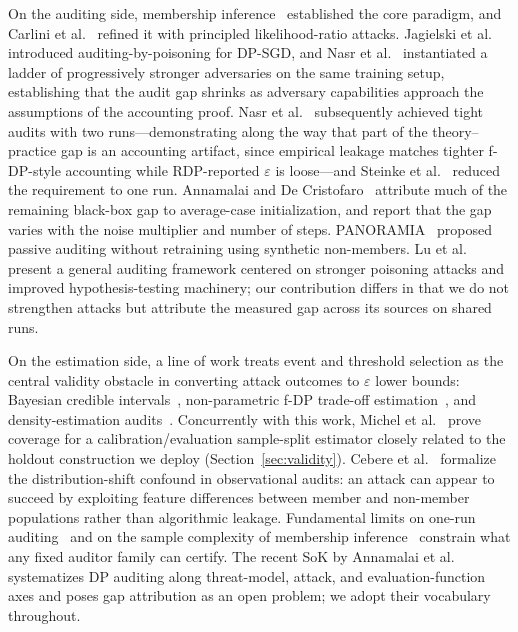 \documentclass{article}
\begin{document}
On the auditing side, membership inference~\citep{shokri2017membership} established the core paradigm, and Carlini et al.~\citep{carlini2022membership} refined it with principled likelihood-ratio attacks. Jagielski et al.~\citep{jagielski2020auditing} introduced auditing-by-poisoning for DP-SGD, and Nasr et al.~\citep{nasr2021adversary} instantiated a ladder of progressively stronger adversaries on the same training setup, establishing that the audit gap shrinks as adversary capabilities approach the assumptions of the accounting proof. Nasr et al.~\citep{nasr2023tight} subsequently achieved tight audits with two runs---demonstrating along the way that part of the theory--practice gap is an accounting artifact, since empirical leakage matches tighter f-DP-style accounting while RDP-reported $\varepsilon$ is loose---and Steinke et al.~\citep{steinke2023privacy} reduced the requirement to one run. Annamalai and De Cristofaro~\citep{annamalai2024nearly} attribute much of the remaining black-box gap to average-case initialization, and report that the gap varies with the noise multiplier and number of steps. PANORAMIA~\citep{kazmi2024panoramia} proposed passive auditing without retraining using synthetic non-members. Lu et al.~\citep{lu2022general} present a general auditing framework centered on stronger poisoning attacks and improved hypothesis-testing machinery; our contribution differs in that we do not strengthen attacks but attribute the measured gap across its sources on shared runs.

On the estimation side, a line of work treats event and threshold selection as the central validity obstacle in converting attack outcomes to $\varepsilon$ lower bounds: Bayesian credible intervals~\citep{zanella2023bayesian}, non-parametric f-DP trade-off estimation~\citep{askin2025fdp}, and density-estimation audits~\citep{koskela2025density}. Concurrently with this work, Michel et al.~\citep{michel2026sequential} prove coverage for a calibration/evaluation sample-split estimator closely related to the holdout construction we deploy (Section~\ref{sec:validity}). Cebere et al.~\citep{cebere2026zerorun} formalize the distribution-shift confound in observational audits: an attack can appear to succeed by exploiting feature differences between member and non-member populations rather than algorithmic leakage. Fundamental limits on one-run auditing~\citep{keinan2025onerun} and on the sample complexity of membership inference~\citep{haghifam2025sample} constrain what any fixed auditor family can certify. The recent SoK by Annamalai et al.~\citep{annamalai2026sok} systematizes DP auditing along threat-model, attack, and evaluation-function axes and poses gap attribution as an open problem; we adopt their vocabulary throughout.
\end{document}
